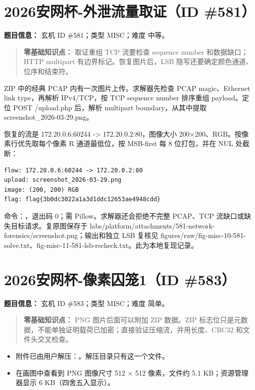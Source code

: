 \section{2026安网杯-外泄流量取证（ID \#581）}\label{ux5b89ux7f51ux676f-ux5916ux6cc4ux6d41ux91cfux53d6ux8bc1id-581}

\textbf{题目信息：} 玄机 ID \#581；类型 MISC；难度 中等。

\begin{quote}
\textbf{零基础知识点：} 取证重组 TCP 流要检查 sequence number 和数据缺口；HTTP multipart 有边界标记。恢复图片后，LSB 隐写还要确定颜色通道、位序和结束符。
\end{quote}

ZIP 中的经典 PCAP 内有一次图片上传。求解器先检查 PCAP magic、Ethernet link type，再解析 IPv4/TCP，按 TCP sequence number 排序重组 payload。定位 POST /upload.php 后，解析 multipart boundary，从其中提取 screenshot\_2026-03-29.png。

恢复的流是 172.20.0.6:60244 -\textgreater{} 172.20.0.2:80，图像大小 200×200、RGB。按像素行优先取每个像素 R 通道最低位，按 MSB-first 每 8 位打包，并在 NUL 处截断：

\begin{verbatim}
flow: 172.20.0.6:60244 -> 172.20.0.2:80
upload: screenshot_2026-03-29.png
image: (200, 200) RGB
flag: flag{3b0dc3022a1a3d1ddc12653ae4948cdd}
\end{verbatim}

命令：\texttt{}，退出码 0；需 Pillow。求解器还会拒绝不完整 PCAP、TCP 流缺口或缺失目标请求。复原图保存于 labs/platform/attachments/581-network-forensics/screenshot.png；输出和独立 LSB 复核见 figures/raw/fig-misc-10-581-solve.txt、fig-misc-11-581-lsb-recheck.txt。此为本地复现记录。

\section{2026安网杯-像素囚笼1（ID \#583）}\label{ux5b89ux7f51ux676f-ux50cfux7d20ux56daux7b3c1id-583}

\textbf{题目信息：} 玄机 ID \#583；类型 MISC；难度 简单。

\begin{quote}
\textbf{零基础知识点：} PNG 图片后面可以附加 ZIP 数据。ZIP 标志位只是元数据，不能单独证明载荷已加密；直接验证压缩流，并用长度、CRC32 和文件头交叉检查。
\end{quote}

\begin{itemize}
\tightlist
\item
  附件已由用户解压：\texttt{}。解压目录只有这一个文件。
\item
  在画图中查看到 PNG 图像尺寸 512 × 512 像素，文件约 5.1 KB；资源管理器显示 6 KB（四舍五入显示）。
\end{itemize}

